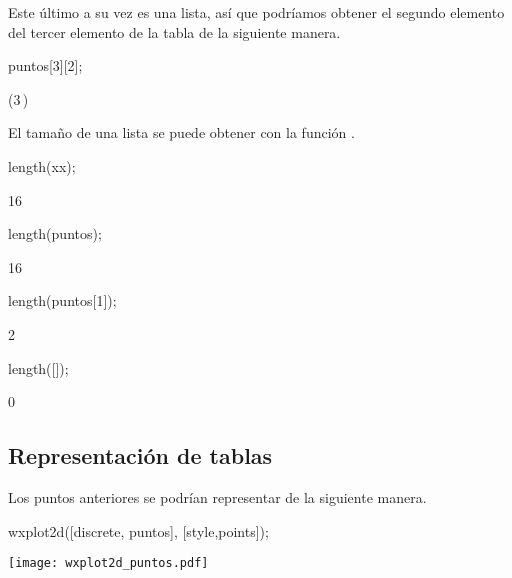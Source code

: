 Este último a su vez es una lista, así que podríamos obtener
el segundo elemento del tercer elemento de la tabla 
de la siguiente manera.
\begin{maximai}
	puntos[3][2];
\end{maximai}\begin{maximao}
	\sin \left({{3\,\pi}}\right)
\end{maximao}

El tamaño de una lista se puede obtener con la función
.
\begin{maximai}
	length(xx);
\end{maximai}\begin{maximao}
	16
\end{maximao}\begin{maximai}
	length(puntos);
\end{maximai}\begin{maximao}
	16
\end{maximao}\begin{maximai}
	length(puntos[1]);
\end{maximai}\begin{maximao}
	2
\end{maximao}\begin{maximai}
	length([]);
\end{maximai}\begin{maximao}
	0
\end{maximao}

\subsection*{Representación de tablas}

Los puntos anteriores se podrían representar de la siguiente manera.

\begin{maximai}
	wxplot2d([discrete, puntos], [style,points]);
\end{maximai}\begin{maximat}
	\begin{center}
		\texttt{[image: wxplot2d\_puntos.pdf]}
	\end{center}
\end{maximat}


